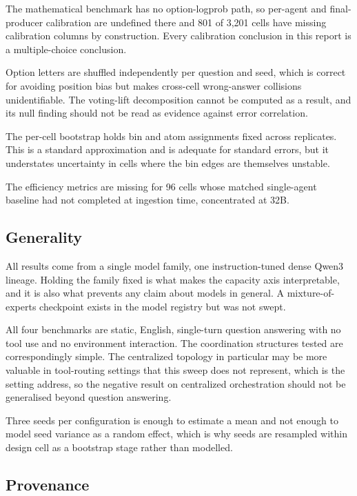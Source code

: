 The mathematical benchmark has no option-logprob path, so per-agent and final-producer
calibration are undefined there and 801 of 3{,}201 cells have missing calibration columns by
construction. Every calibration conclusion in this report is a multiple-choice conclusion.

Option letters are shuffled independently per question and seed, which is correct for
avoiding position bias but makes cross-cell wrong-answer collisions unidentifiable. The
voting-lift decomposition cannot be computed as a result, and its null finding should not be
read as evidence against error correlation.

The per-cell bootstrap holds bin and atom assignments fixed across replicates. This is a
standard approximation and is adequate for standard errors, but it understates uncertainty
in cells where the bin edges are themselves unstable.

The efficiency metrics are missing for 96 cells whose matched single-agent baseline had not
completed at ingestion time, concentrated at 32B.

\subsection{Generality}

All results come from a single model family, one instruction-tuned dense Qwen3 lineage.
Holding the family fixed is what makes the capacity axis interpretable, and it is also what
prevents any claim about models in general. A mixture-of-experts checkpoint exists in the
model registry but was not swept.

All four benchmarks are static, English, single-turn question answering with no tool use and
no environment interaction. The coordination structures tested are correspondingly simple.
The centralized topology in particular may be more valuable in tool-routing settings that
this sweep does not represent, which is the setting \citet{wong2026teamofthoughts} address,
so the negative result on centralized orchestration should not be generalised beyond
question answering.

Three seeds per configuration is enough to estimate a mean and not enough to model seed
variance as a random effect, which is why seeds are resampled within design cell as a
bootstrap stage rather than modelled.

\subsection{Provenance}

